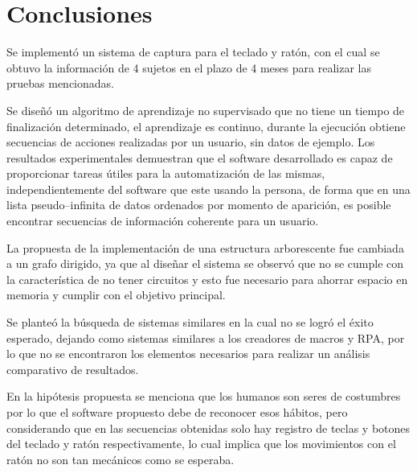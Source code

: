 \section{Conclusiones}

Se implement\'o un sistema de captura para el teclado y rat\'on, con el cual
 se obtuvo la informaci\'on de 4 sujetos en el plazo de 4 meses para 
 realizar las pruebas mencionadas.


Se dise\~n\'o un algoritmo de aprendizaje no supervisado que no tiene un
 tiempo de finalizaci\'on determinado, el aprendizaje es continuo, durante la 
 ejecuci\'on obtiene secuencias de acciones realizadas por un usuario, sin 
 datos de ejemplo. Los resultados experimentales demuestran que el software 
 desarrollado es capaz de proporcionar tareas \'utiles para la 
 automatizaci\'on de las mismas, independientemente del software que este 
 usando la persona, de forma que en una lista pseudo--infinita de datos 
 ordenados por momento de aparici\'on, es posible encontrar secuencias de 
 informaci\'on coherente para un usuario.

	
La propuesta de la implementaci\'on de una estructura arborescente fue
 cambiada a un grafo dirigido, ya que al dise\~nar el sistema se observ\'o que 
 no se cumple con la caracter\'istica de no tener circuitos y esto fue 
 necesario para ahorrar espacio en memoria y cumplir con el objetivo 
 principal.


Se plante\'o la b\'usqueda de sistemas similares en la cual no se logr\'o 
 el \'exito esperado, dejando como sistemas similares a los creadores de
 macros y RPA, por lo que no se encontraron los elementos necesarios 
 para realizar un an\'alisis comparativo de resultados.


En la hip\'otesis propuesta se menciona que los humanos son seres de 
 costumbres por lo que el software propuesto debe de reconocer esos h\'abitos, 
 pero considerando que en las secuencias obtenidas solo hay registro de teclas
 y botones del teclado y rat\'on respectivamente, lo cual implica que los
 movimientos con el rat\'on no son tan mec\'anicos como se esperaba.
 